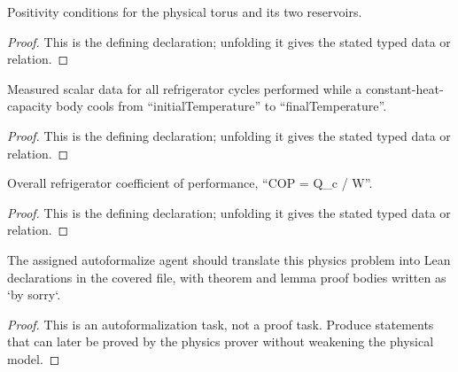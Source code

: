 \begin{definition}[HasPhysicalCycleParameters]
  \label{decl:physics:IPhO_2026_3_C_5:HasPhysicalCycleParameters}
  Positivity conditions for the physical torus and its two reservoirs.
\end{definition}
\begin{proof}
  This is the defining declaration; unfolding it gives the stated typed data or relation.
\end{proof}

\begin{definition}[CoolingRun]
  \label{decl:physics:IPhO_2026_3_C_5:CoolingRun}
  Measured scalar data for all refrigerator cycles performed while a constant-heat-capacity body cools from “initialTemperature” to “finalTemperature”.
\end{definition}
\begin{proof}
  This is the defining declaration; unfolding it gives the stated typed data or relation.
\end{proof}

\begin{definition}[coefficientOfPerformance]
  \label{decl:physics:IPhO_2026_3_C_5:coefficientOfPerformance}
  Overall refrigerator coefficient of performance, “COP = Q\_c / W”.
\end{definition}
\begin{proof}
  This is the defining declaration; unfolding it gives the stated typed data or relation.
\end{proof}

\begin{theorem}
\label{thm:physics:IPhO_2026_3_C_5:target}
The assigned autoformalize agent should translate this physics problem into Lean declarations in the covered file, with theorem and lemma proof bodies written as `by sorry`.
\end{theorem}
\begin{proof}
This is an autoformalization task, not a proof task. Produce statements that can later be proved by the physics prover without weakening the physical model.
\end{proof}
